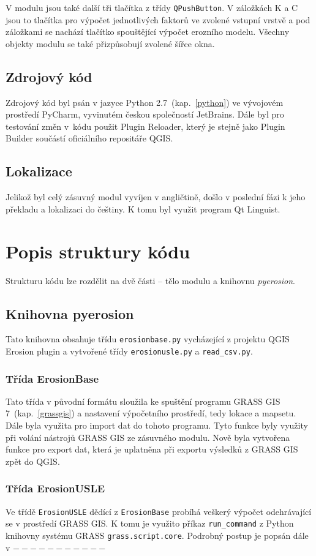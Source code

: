 V modulu jsou také další tři tlačítka z třídy \texttt{QPushButton}. V
záložkách K a C jsou to tlačítka pro výpočet jednotlivých faktorů ve
zvolené vstupní vrstvě a pod záložkami se nachází tlačítko spouštějící
výpočet erozního modelu. Všechny objekty modulu se také přizpůsobují
zvolené šířce okna.
\subsection{Zdrojový kód} Zdrojový kód byl psán v jazyce Python
2.7~(kap.~\ref{python}) ve vývojovém prostředí PyCharm, vyvinutém
českou společností JetBrains. Dále byl pro testování změn v~kódu
použit Plugin Reloader, který je stejně jako Plugin Builder součástí
oficiálního repositáře QGIS.
\subsection{Lokalizace} Jelikož byl celý zásuvný modul vyvíjen v
angličtině, došlo v poslední fázi k jeho překladu a lokalizaci do
češtiny. K tomu byl využit program Qt Linguist.

\section{Popis struktury kódu} Strukturu kódu lze rozdělit na dvě
části – tělo modulu a knihovnu \textit{pyerosion}.
\subsection{Knihovna pyerosion} Tato knihovna obsahuje třídu
\texttt{erosionbase.py} vycházející z projektu QGIS Erosion
plugin\cite{erosiongithub} a vytvořené třídy \texttt{erosionusle.py} a
\texttt{read\_csv.py}.
\subsubsection{Třída ErosionBase} Tato třída v původní formátu
sloužila ke spuštění programu GRASS GIS 7~(kap.~\ref{grassgis}) a
nastavení výpočetního prostředí, tedy lokace a mapsetu. Dále byla
využita pro import dat do tohoto programu. Tyto funkce byly využity
při volání nástrojů GRASS GIS ze zásuvného modulu. Nově byla vytvořena
funkce pro export dat, která je uplatněna při exportu výsledků z GRASS
GIS zpět do QGIS.
\subsubsection{Třída ErosionUSLE} Ve třídě \texttt{ErosionUSLE} dědící
z \texttt{ErosionBase} probíhá veškerý výpočet odehrávající se v
prostředí GRASS GIS. K tomu je využito příkaz \texttt{run\_command} z
Python knihovny systému GRASS \texttt{grass.script.core}. Podrobný
postup je popsán dále v $-----------$

